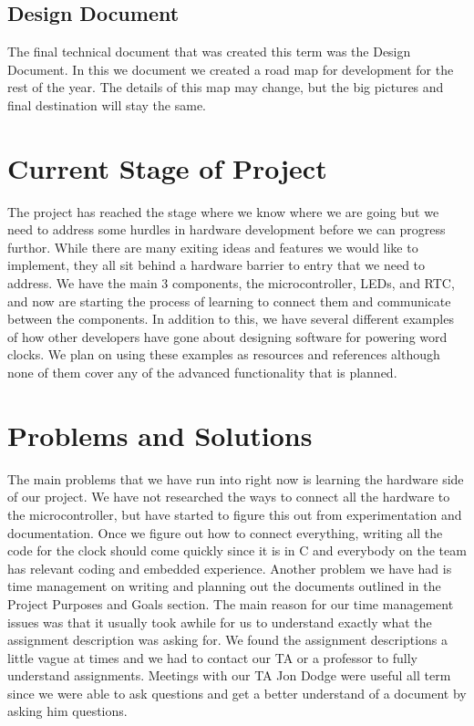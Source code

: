 \documentclass[onecolumn, draftclsnofoot,10pt, compsoc]{IEEEtran}
\begin{document}
\subsection{Design Document}
The final technical document that was created this term was the Design Document.
In this we document we created a road map for development for the rest of the year.
The details of this map may change, but the big pictures and final destination will stay the same.

\section{Current Stage of Project}
The project has reached the stage where we know where we are going but we need to address some hurdles in hardware development before we can progress furthor.
While there are many exiting ideas and features we would like to implement, they all sit behind a hardware barrier to entry that we need to address.
We have the main 3 components, the microcontroller, LEDs, and RTC, and now are starting the process of learning to connect them and communicate between the components.
In addition to this, we have several different examples of how other developers have gone about designing software for powering word clocks.
We plan on using these examples as resources and references although none of them cover any of the advanced functionality that is planned.
\section{Problems and Solutions}
The main problems that we have run into right now is learning the hardware side of our project.
We have not researched the ways to connect all the hardware to the microcontroller, but have started to figure this out from experimentation and documentation.
Once we figure out how to connect everything, writing all the code for the clock should come quickly since it is in C and everybody on the team has relevant coding and embedded experience.
Another problem we have had is time management on writing and planning out the documents outlined in the Project Purposes and Goals section.
The main reason for our time management issues was that it usually took awhile for us to understand exactly what the assignment description was asking for.
We found the assignment descriptions a little vague at times and we had to contact our TA or a professor to fully understand assignments.
Meetings with our TA Jon Dodge were useful all term since we were able to ask questions and get a better understand of a document by asking him questions.
\end{document}
